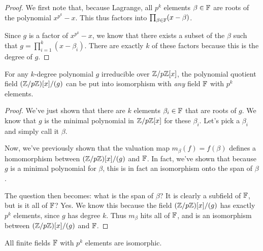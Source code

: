 \begin{proof}
  We first note that, because Lagrange, all $p^k$ elements $\beta \in
  \mathbb{F}$ are roots of the polynomial $x^{p^k} - x$. This thus factors into
  $\prod_{\beta\in\mathbb{F}} (x - \beta)$.

  Since $g$ is a factor of $x^{p^k} - x$, we know that there exists a
  subset of the $\beta$ such that $g = \prod_{i=1}^k (x - \beta_i)$.
  There are exactly $k$ of these factors because this is the degree of
  $g$.
\end{proof}

\begin{theorem}
  For any $k$-degree polynomial $g$ irreducible over $\mathbb{Z} / p\mathbb{Z}[x]$, the
  polynomial quotient field $\mathopen{}\left( {\mathbb{Z} / p\mathbb{Z}} \right)\mathclose{}[x]/(g)$ can be put into isomorphism with
  \emph{any} field $\mathbb{F}$ with $p^k$ elements.
\end{theorem}

\begin{proof}
  We've just shown that there are $k$ elements $\beta_i \in \mathbb{F}$ that are
  roots of $g$. We know that $g$ is the minimal polynomial in
  $\mathbb{Z} / p\mathbb{Z}[x]$ for these $\beta_i$. Let's pick a $\beta_i$ and simply
  call it $\beta$.

  Now, we've previously shown that the valuation map $m_\beta(f) =
  f(\beta)$ defines a homomorphism between $\mathopen{}\left( {\mathbb{Z} / p\mathbb{Z}} \right)\mathclose{}[x]/(g)$ and $\mathbb{F}$. In fact,
  we've shown that because $g$ is a minimal polynomial for $\beta$, this
  is in fact an isomorphism onto the span of $\beta$.

  The question then becomes: what is the span of $\beta$? It is clearly
  a subfield of $\mathbb{F}$, but is it all of $\mathbb{F}$? Yes. We know this because
  the field $\mathopen{}\left( {\mathbb{Z} / p\mathbb{Z}} \right)\mathclose{}[x]/(g)$ has exactly $p^k$ elements, since $g$ has degree
  $k$. Thus $m_\beta$ hits all of $\mathbb{F}$, and is an isomorphism between
  $\mathopen{}\left( {\mathbb{Z} / p\mathbb{Z}} \right)\mathclose{}[x]/(g)$ and $\mathbb{F}$.
\end{proof}

\begin{corollary}
  All finite fields $\mathbb{F}$ with $p^k$ elements are isomorphic.
\end{corollary}

